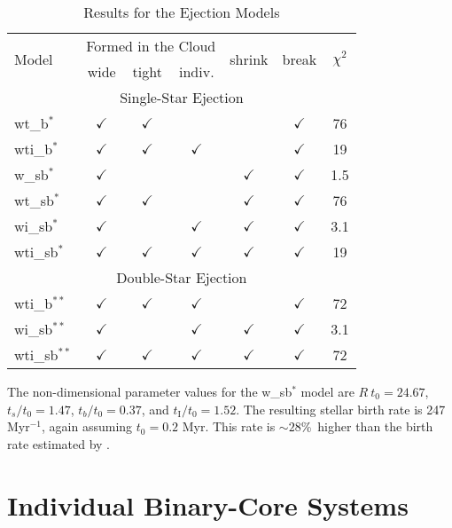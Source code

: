 \documentclass[usenatbib,a4paper]{mnras}
\newcommand{\tOI}{\mbox{$t_{0}$}} %
\newcommand{\tI}{\mbox{$t_\textrm{I}$}}%
\begin{document}
\begin{table}
\caption{Results for the Ejection Models}\label{modelTable2}
\begin{tabular}{lcccccc}%
\hline\hline
\multirow{2}{*}{Model} 	&  \multicolumn{3}{c}{Formed in the Cloud}	&  \multirow{2}{*}{shrink} & \multirow{2}{*}{break} & \multirow{2}{*}{$\chi^2$}  \\								%
		&  wide	     	   & tight	         	& indiv.	      	   &		       		&	 			& \\
\hline
\multicolumn{7}{c}{Single-Star Ejection} \\
\hline
wt\_b$^{\ast}$	& $\checkmark$  &$\checkmark$  	&			   &		       		& $\checkmark$  	& 76\\ 
wti\_b$^{\ast}$	& $\checkmark$  & $\checkmark$  	& $\checkmark$  &		        		& $\checkmark$  	& 19 \\
w\_sb$^{\ast}$	& $\checkmark$  &		         	&			   & $\checkmark$  	& $\checkmark$  	& 1.5 \\ 
wt\_sb$^{\ast}$	& $\checkmark$  & $\checkmark$  	&			   & $\checkmark$  	& $\checkmark$  	& 76 \\ 
wi\_sb$^{\ast}$ 	& $\checkmark$  & 		         	& $\checkmark$  & $\checkmark$  	& $\checkmark$ 	& 3.1 \\
wti\_sb$^{\ast}$	& $\checkmark$  & $\checkmark$  	& $\checkmark$  & $\checkmark$  	& $\checkmark$  	& 19 \\
\hline
\multicolumn{7}{c}{Double-Star Ejection} \\
\hline
wti\_b$^{\ast\ast}$	& $\checkmark$  & $\checkmark$  	& $\checkmark$   & 			 	& $\checkmark$  	& 72 \\ 
wi\_sb$^{\ast\ast}$ 	& $\checkmark$  & 		         	& $\checkmark$  & $\checkmark$  	& $\checkmark$ 	& 3.1 \\
wti\_sb$^{\ast\ast}$	& $\checkmark$  & $\checkmark$  	& $\checkmark$  & $\checkmark$  	& $\checkmark$  	& 72 \\
\hline
\end{tabular}
\end{table}

The non-dimensional parameter values for the w\_sb$^{\ast}$ model are $R\ \tOI = 24.67$, $t_s/\tOI = 1.47$, $t_b/\tOI = 0.37$, and $\tI/\tOI = 1.52$.   The resulting stellar birth rate is 247 Myr$^{-1}$,  again assuming $\tOI = 0.2$ Myr.  This rate is $\sim 28$\%\ higher than the birth rate estimated by \citet{Evans09}.


\section{Individual Binary-Core Systems} \label{appendix}
\end{document}
